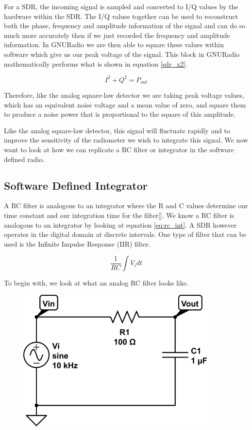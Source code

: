 For a SDR, the incoming signal is sampled and converted to I/Q values by the hardware within the SDR.  The I/Q values together can be used to reconstruct both the phase, frequency and amplitude information of the signal and can do so much more accurately then if we just recorded the frequency and amplitude information.  In GNURadio we are then able to square these values within software which give us our peak voltage of the signal.  This block in GNURadio mathematically performs what is shown in equation \ref{sdr_x2}.

\begin{equation}\label{sdr_x2}
I^2+Q^2 = P_{out}
\end{equation}

Therefore, like the analog square-law detector we are taking peak voltage values, which has an equivalent noise voltage and a mean value of zero, and square them to produce a noise power that is proportional to the square of this amplitude.

Like the analog square-law detector, this signal will fluctuate rapidly and to improve the sensitivity of the radiometer we wish to integrate this signal.  We now want to look at how we can replicate a RC filter or integrator in the software defined radio.

\subsection{Software Defined Integrator}
A RC filter is analogous to an integrator where the R and C values determine our time constant and our integration time for the filter[\cite{Aitken}].  We know a RC filter is analogous to an integrator by looking at equation \ref{eq:rc_int}.  A SDR however operates in the digital domain at discrete intervals.  One type of filter that can be used is the Infinite Impulse Response (IIR) filter. 

\begin{equation}\label{eq:rc_int}
\frac{1}{RC}\int{V_idt}
\end{equation}


To begin with, we look at what an analog RC filter looks like. 

{\begin{figure}[h!tb] 
\centering
\includegraphics[width=10cm]{Images/rc-circuit.png}
\label{rc_circuit}
\end{figure}
}

